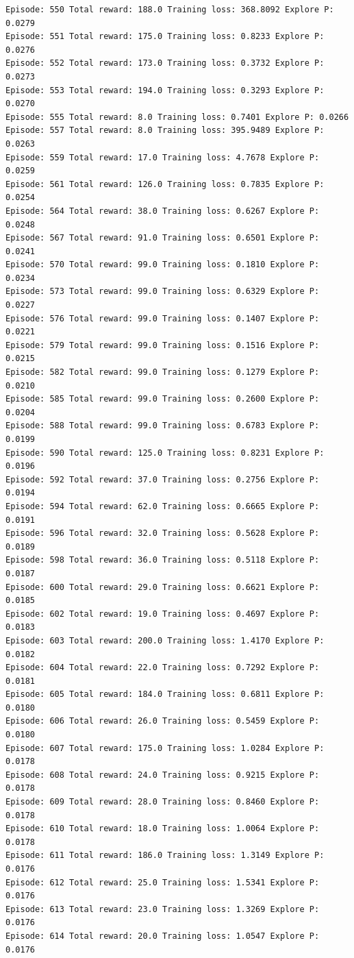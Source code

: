 \documentclass[11pt]{article}
\begin{document}
\begin{Verbatim}[commandchars=\\\{\}]
Episode: 550 Total reward: 188.0 Training loss: 368.8092 Explore P: 0.0279
Episode: 551 Total reward: 175.0 Training loss: 0.8233 Explore P: 0.0276
Episode: 552 Total reward: 173.0 Training loss: 0.3732 Explore P: 0.0273
Episode: 553 Total reward: 194.0 Training loss: 0.3293 Explore P: 0.0270
Episode: 555 Total reward: 8.0 Training loss: 0.7401 Explore P: 0.0266
Episode: 557 Total reward: 8.0 Training loss: 395.9489 Explore P: 0.0263
Episode: 559 Total reward: 17.0 Training loss: 4.7678 Explore P: 0.0259
Episode: 561 Total reward: 126.0 Training loss: 0.7835 Explore P: 0.0254
Episode: 564 Total reward: 38.0 Training loss: 0.6267 Explore P: 0.0248
Episode: 567 Total reward: 91.0 Training loss: 0.6501 Explore P: 0.0241
Episode: 570 Total reward: 99.0 Training loss: 0.1810 Explore P: 0.0234
Episode: 573 Total reward: 99.0 Training loss: 0.6329 Explore P: 0.0227
Episode: 576 Total reward: 99.0 Training loss: 0.1407 Explore P: 0.0221
Episode: 579 Total reward: 99.0 Training loss: 0.1516 Explore P: 0.0215
Episode: 582 Total reward: 99.0 Training loss: 0.1279 Explore P: 0.0210
Episode: 585 Total reward: 99.0 Training loss: 0.2600 Explore P: 0.0204
Episode: 588 Total reward: 99.0 Training loss: 0.6783 Explore P: 0.0199
Episode: 590 Total reward: 125.0 Training loss: 0.8231 Explore P: 0.0196
Episode: 592 Total reward: 37.0 Training loss: 0.2756 Explore P: 0.0194
Episode: 594 Total reward: 62.0 Training loss: 0.6665 Explore P: 0.0191
Episode: 596 Total reward: 32.0 Training loss: 0.5628 Explore P: 0.0189
Episode: 598 Total reward: 36.0 Training loss: 0.5118 Explore P: 0.0187
Episode: 600 Total reward: 29.0 Training loss: 0.6621 Explore P: 0.0185
Episode: 602 Total reward: 19.0 Training loss: 0.4697 Explore P: 0.0183
Episode: 603 Total reward: 200.0 Training loss: 1.4170 Explore P: 0.0182
Episode: 604 Total reward: 22.0 Training loss: 0.7292 Explore P: 0.0181
Episode: 605 Total reward: 184.0 Training loss: 0.6811 Explore P: 0.0180
Episode: 606 Total reward: 26.0 Training loss: 0.5459 Explore P: 0.0180
Episode: 607 Total reward: 175.0 Training loss: 1.0284 Explore P: 0.0178
Episode: 608 Total reward: 24.0 Training loss: 0.9215 Explore P: 0.0178
Episode: 609 Total reward: 28.0 Training loss: 0.8460 Explore P: 0.0178
Episode: 610 Total reward: 18.0 Training loss: 1.0064 Explore P: 0.0178
Episode: 611 Total reward: 186.0 Training loss: 1.3149 Explore P: 0.0176
Episode: 612 Total reward: 25.0 Training loss: 1.5341 Explore P: 0.0176
Episode: 613 Total reward: 23.0 Training loss: 1.3269 Explore P: 0.0176
Episode: 614 Total reward: 20.0 Training loss: 1.0547 Explore P: 0.0176

\end{Verbatim}
\end{document}

